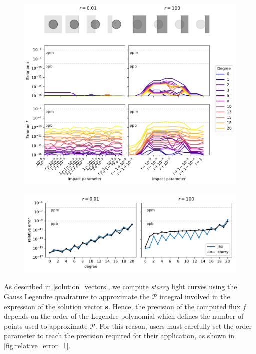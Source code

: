 \documentclass[modern]{aastex631}
\begin{document}
\begin{figure}[H]
    \begin{center}
        \includegraphics[width=\textwidth]{../workflows/precision/figures/error_jax.pdf}
        \caption{}
        \label{fig:precision_s}
    \end{center}
\end{figure}
\begin{figure}[H]
    \begin{center}
        \includegraphics[width=\textwidth]{../workflows/precision/figures/error_degree.pdf}
        \caption{}
        \label{fig:precision_degree}
    \end{center}
\end{figure}
As described in \autoref{solution_vectors}, we compute \textit{starry} light curves using the Gauss Legendre quadrature to approximate the $\mathcal{P}$ integral involved in the expression of the solution vector $\bm{s}$. Hence, the precision of the computed flux $f$ depends on the order of the Legendre polynomial which defines the number of points used to approximate $\mathcal{P}$. For this reason, users must carefully set the order parameter to reach the precision required for their application, as shown in \autoref{fig:relative_error_1}.\\\\
\end{document}
